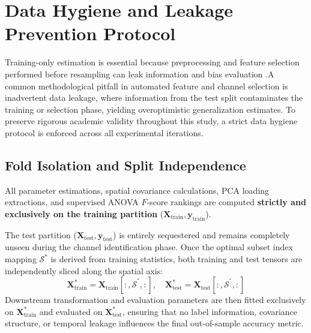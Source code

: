 \section{Data Hygiene and Leakage Prevention Protocol}
\label{sec:data_hygiene}

\noindent
Training-only estimation is essential because preprocessing and feature
selection performed before resampling can leak information and bias evaluation
\citep{ambroise2002selection,varma2006bias,cawley2010overfitting,
kaufman2012leakage}.A common methodological pitfall in automated feature and channel selection is inadvertent data leakage, where information from the test split contaminates the training or selection phase, yielding overoptimistic generalization estimates. To preserve rigorous academic validity throughout this study, a strict data hygiene protocol is enforced across all experimental iterations.

\subsection{Fold Isolation and Split Independence}
\noindent
All parameter estimations, spatial covariance calculations, PCA loading extractions, and supervised ANOVA $F$-score rankings are computed \textbf{strictly and exclusively on the training partition} ($\mathbf{X}_{\text{train}}, \mathbf{y}_{\text{train}}$). 

\noindent
The test partition ($\mathbf{X}_{\text{test}}, \mathbf{y}_{\text{test}}$) is entirely sequestered and remains completely unseen during the channel identification phase. Once the optimal subset index mapping $\mathcal{S}^*$ is derived from training statistics, both training and test tensors are independently sliced along the spatial axis:
\begin{equation}
    \mathbf{X}_{\text{train}}^{*} = \mathbf{X}_{\text{train}}[:, \mathcal{S}^^*, :], \quad \mathbf{X}_{\text{test}}^{*} = \mathbf{X}_{\text{test}}[:, \mathcal{S}^^*, :]
\end{equation}
Downstream transformation and evaluation parameters are then fitted exclusively on $\mathbf{X}_{\text{train}}^{*}$ and evaluated on $\mathbf{X}_{\text{test}}^{*}$, ensuring that no label information, covariance structure, or temporal leakage influences the final out-of-sample accuracy metric.